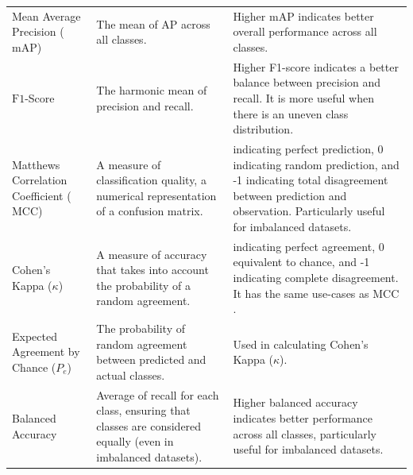 \begin{table}[!htbp]
\begin{tabularx}{\textwidth}{@{\extracolsep{\fill}}>{\raggedright\arraybackslash}X >{\raggedright\arraybackslash}X >{\raggedright\arraybackslash}X}
		\addlinespace
		Mean Average Precision ($\mathrm{mAP}$)                                                                                         & The mean of AP across all classes.                                                                            & Higher mAP indicates better overall performance across all classes.                                                                                                                    \\
		\addlinespace
		$\mathrm{F1}$-Score                                                                                                             & The harmonic mean of precision and recall.                                                                    & Higher F1-score indicates a better balance between precision and recall. It is more useful when there is an uneven class distribution.                                                 \\
		\addlinespace
		Matthews Correlation Coefficient ($\mathrm{MCC}$)                                                                               & A measure of classification quality, a numerical representation of a confusion matrix.                        & 1 indicating perfect prediction, 0 indicating random prediction, and -1 indicating total disagreement between prediction and observation. Particularly useful for imbalanced datasets. \\
		\addlinespace
		Cohen's Kappa ($\kappa$)                                                                                                        & A measure of accuracy that takes into account the probability of a random agreement.                          & 1 indicating perfect agreement, 0 equivalent to chance, and -1 indicating complete disagreement. It has the same use-cases as $\mathrm{MCC}$.                                          \\
		\addlinespace
		Expected Agreement by Chance ($P_e$)                                                                                            & The probability of random agreement between predicted and actual classes.                                     & Used in calculating Cohen's Kappa ($\kappa$).                                                                                                                                          \\
		\addlinespace
		Balanced Accuracy                                                                                                               & Average of recall for each class, ensuring that classes are considered equally (even in imbalanced datasets). & Higher balanced accuracy indicates better performance across all classes, particularly useful for imbalanced datasets.                                                                 \\

\end{tabularx}
\end{table}
